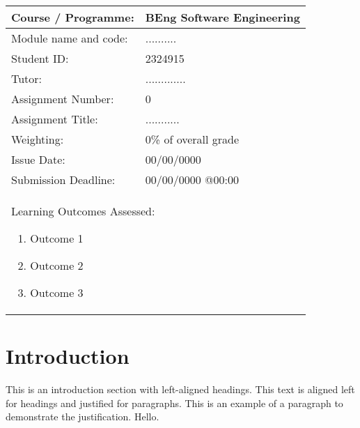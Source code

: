 \documentclass[12pt]{article}
\begin{document}
\begin{table}[h]
  \centering
  \begin{tabular}{|l|l|}
      \hline
      Course / Programme: & BEng Software Engineering \\
      \hline
      Module name and code: & .......... \\
      \hline
      Student ID: & 2324915 \\
      \hline
      Tutor: & ............. \\
      \hline
      Assignment Number: & 0 \\
      \hline
      Assignment Title: & ........... \\
      \hline
      Weighting: & 0\% of overall grade \\
      \hline
      Issue Date: & 00/00/0000 \\
      \hline
      Submission Deadline: & 00/00/0000 @00:00 \\
      \hline
      \multicolumn{2}{|l|}{
        \begin{minipage}{\dimexpr\textwidth-2\tabcolsep\relax} %
        \vspace{16pt} %
        Learning Outcomes Assessed:
          \begin{enumerate}
            \item Outcome 1
            \item Outcome 2
            \item Outcome 3
          \end{enumerate}
          \vspace{16pt} %
        \end{minipage}
      } \\
      \hline
  \end{tabular}
\end{table}

\newpage

\tableofcontents

\newpage %

\section{Introduction}
\label{sec:introduction}
This is an introduction section with left-aligned headings. This text is aligned left for headings and justified for paragraphs. This is an example of a paragraph to demonstrate the justification. Hello.
\end{document}

